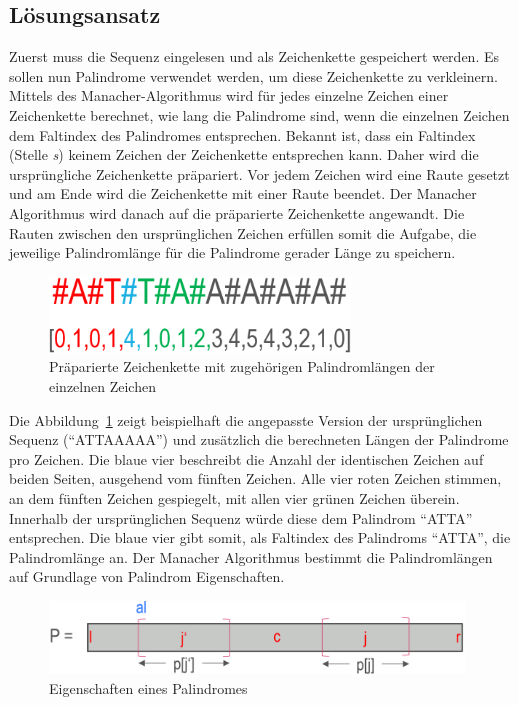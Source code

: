 \subsection{Lösungsansatz}
\label{subsec:Abb}
Zuerst muss die Sequenz eingelesen und als Zeichenkette gespeichert werden. Es sollen nun Palindrome verwendet werden, um diese Zeichenkette zu verkleinern. Mittels des Manacher-Algorithmus wird für jedes einzelne Zeichen einer Zeichenkette berechnet, wie lang die Palindrome sind, wenn die einzelnen Zeichen dem Faltindex des Palindromes entsprechen. Bekannt ist, dass ein Faltindex (Stelle \textit{s}) keinem Zeichen der Zeichenkette entsprechen kann. Daher wird die ursprüngliche Zeichenkette präpariert. Vor jedem Zeichen wird eine Raute gesetzt und am Ende wird die Zeichenkette mit einer Raute beendet. Der Manacher Algorithmus wird danach auf die präparierte Zeichenkette angewandt. Die Rauten zwischen den ursprünglichen Zeichen erfüllen somit die Aufgabe, die jeweilige Palindromlänge für die Palindrome gerader Länge zu speichern.
\begin{figure}[h]
    \centering
    \includegraphics[width=8cm]{Bilder2/Abb1.PNG}
    \caption{Präparierte Zeichenkette mit zugehörigen Palindromlängen der einzelnen Zeichen}
    \label{fig:enter-label1}
\end{figure}
Die Abbildung~\ref{fig:enter-label1} zeigt beispielhaft die angepasste Version der ursprünglichen Sequenz (“ATTAAAAA”) und zusätzlich die berechneten Längen der Palindrome pro Zeichen. Die blaue vier beschreibt die Anzahl der identischen Zeichen auf beiden Seiten, ausgehend vom fünften Zeichen. Alle vier roten Zeichen stimmen, an dem fünften Zeichen gespiegelt, mit allen vier grünen Zeichen überein. Innerhalb der ursprünglichen Sequenz würde diese dem Palindrom “ATTA” entsprechen. Die blaue vier gibt somit, als Faltindex des Palindroms “ATTA”,  die Palindromlänge an. Der Manacher Algorithmus bestimmt die Palindromlängen auf Grundlage von Palindrom Eigenschaften.
\begin{figure}[h]
    \centering
    \includegraphics[width=11cm]{Bilder2/Abb2.PNG}
    \caption{Eigenschaften eines Palindromes}
    \label{fig:enter-label2}
\end{figure}

